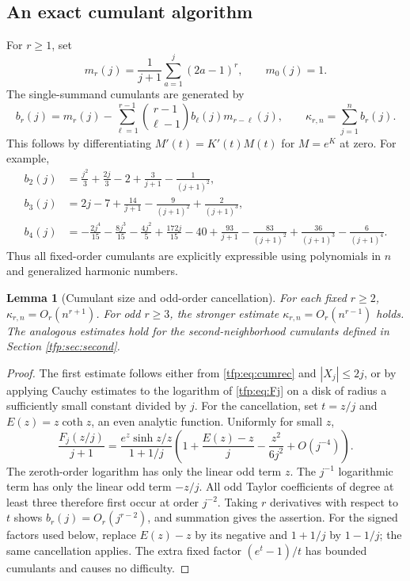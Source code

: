 \documentclass[11pt,a4paper]{article}
\numberwithin{equation}{section}
\newtheorem{lemma}[theorem]{Lemma}
\theoremstyle{definition}\newtheorem{definition}[theorem]{Definition}
\theoremstyle{remark}\newtheorem{remark}[theorem]{Remark}
\begin{document}
\subsection{An exact cumulant algorithm}
For $r\ge1$, set
\begin{equation}\label{tfp:eq:moment}
 m_r(j)=\frac1{j+1}\sum_{a=1}^j(2a-1)^r,
 \qquad m_0(j)=1.
\end{equation}
The single-summand cumulants are generated by
\begin{equation}\label{tfp:eq:cumrec}
 b_r(j)=m_r(j)-\sum_{\ell=1}^{r-1}
       \binom{r-1}{\ell-1}b_\ell(j)m_{r-\ell}(j),
 \qquad \kappa_{r,n}=\sum_{j=1}^n b_r(j).
\end{equation}
This follows by differentiating $M'(t)=K'(t)M(t)$ for $M=e^K$ at zero.
For example,
\begin{align}
 b_2(j)&=\frac{j^2}{3}+\frac{2j}{3}-2
                  +\frac3{j+1}-\frac1{(j+1)^2},\\
 b_3(j)&=2j-7+\frac{14}{j+1}
                  -\frac9{(j+1)^2}+\frac2{(j+1)^3},\\
 b_4(j)&=-\frac{2j^4}{15}-\frac{8j^3}{15}-\frac{4j^2}{5}
       +\frac{172j}{15}-40+\frac{93}{j+1}
       -\frac{83}{(j+1)^2}+\frac{36}{(j+1)^3}
       -\frac6{(j+1)^4}.
\end{align}
Thus all fixed-order cumulants are explicitly expressible using
polynomials in $n$ and generalized harmonic numbers.

\begin{lemma}[Cumulant size and odd-order cancellation]\label{tfp:lem:cumulants}
For each fixed $r\ge2$, $\kappa_{r,n}=O_r(n^{r+1})$.
For odd $r\ge3$, the stronger estimate
$\kappa_{r,n}=O_r(n^{r-1})$ holds. The analogous estimates hold for the
second-neighborhood cumulants defined in Section \ref{tfp:sec:second}.
\end{lemma}
\begin{proof}
The first estimate follows either from \eqref{tfp:eq:cumrec} and
$|X_j|\le2j$, or by applying Cauchy estimates to the logarithm of
\eqref{tfp:eq:Fj} on a disk of radius a sufficiently small constant divided
by $j$.
For the cancellation, set $t=z/j$ and
$E(z)=z\coth z$, an even analytic function. Uniformly for small $z$,
\begin{equation}
 \frac{F_j(z/j)}{j+1}
 =\frac{e^z\sinh z/z}{1+1/j}
  \left(1+\frac{E(z)-z}{j}-\frac{z^2}{6j^2}
                +O(j^{-4})\right).
\end{equation}
The zeroth-order logarithm has only the linear odd term $z$.
The $j^{-1}$ logarithmic term has only the linear odd term $-z/j$.
All odd Taylor coefficients of degree at least three therefore first
occur at order $j^{-2}$. Taking $r$ derivatives with respect to $t$
shows $b_r(j)=O_r(j^{r-2})$, and summation gives the assertion.
For the signed factors used below, replace $E(z)-z$ by its negative and
$1+1/j$ by $1-1/j$; the same cancellation applies. The extra fixed
factor $(e^t-1)/t$ has bounded cumulants and causes no difficulty.
\end{proof}
\end{document}
